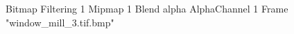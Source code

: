 {Bitmap
	{Filtering 1}
	{Mipmap 1}
	{Blend alpha}
	{AlphaChannel 1}
	{Frame "window_mill_3.tif.bmp"}
}
